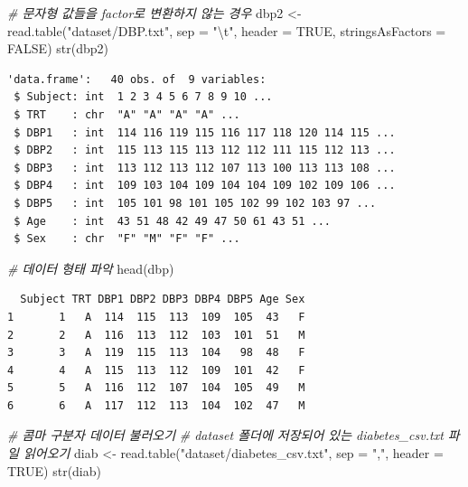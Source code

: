 \documentclass[
  11pt,
]{krantz}
\newenvironment{Shaded}{\begin{snugshade}}{\end{snugshade}}
\newcommand{\AttributeTok}[1]{\textcolor[rgb]{0.61,0.61,0.61}{#1}}
\newcommand{\CommentTok}[1]{\textcolor[rgb]{0.37,0.37,0.37}{\textit{#1}}}
\newcommand{\ConstantTok}[1]{\textcolor[rgb]{0,0,0}{#1}}
\newcommand{\FunctionTok}[1]{\textcolor[rgb]{0,0,0}{#1}}
\newcommand{\NormalTok}[1]{#1}
\newcommand{\OtherTok}[1]{\textcolor[rgb]{0.37,0.37,0.37}{#1}}
\newcommand{\SpecialCharTok}[1]{\textcolor[rgb]{0,0,0}{#1}}
\newcommand{\StringTok}[1]{\textcolor[rgb]{0.5,0.5,0.5}{#1}}
\begin{document}
\begin{Shaded}
\begin{Highlighting}[]
\CommentTok{\# 문자형 값들을 factor로 변환하지 않는 경우}
\NormalTok{dbp2 }\OtherTok{\textless{}{-}} \FunctionTok{read.table}\NormalTok{(}\StringTok{"dataset/DBP.txt"}\NormalTok{, }\AttributeTok{sep =} \StringTok{"}\SpecialCharTok{\textbackslash{}t}\StringTok{"}\NormalTok{, }
                   \AttributeTok{header =} \ConstantTok{TRUE}\NormalTok{, }
                   \AttributeTok{stringsAsFactors =} \ConstantTok{FALSE}\NormalTok{)}
\FunctionTok{str}\NormalTok{(dbp2)}
\end{Highlighting}
\end{Shaded}

\begin{verbatim}
'data.frame':   40 obs. of  9 variables:
 $ Subject: int  1 2 3 4 5 6 7 8 9 10 ...
 $ TRT    : chr  "A" "A" "A" "A" ...
 $ DBP1   : int  114 116 119 115 116 117 118 120 114 115 ...
 $ DBP2   : int  115 113 115 113 112 112 111 115 112 113 ...
 $ DBP3   : int  113 112 113 112 107 113 100 113 113 108 ...
 $ DBP4   : int  109 103 104 109 104 104 109 102 109 106 ...
 $ DBP5   : int  105 101 98 101 105 102 99 102 103 97 ...
 $ Age    : int  43 51 48 42 49 47 50 61 43 51 ...
 $ Sex    : chr  "F" "M" "F" "F" ...
\end{verbatim}

\begin{Shaded}
\begin{Highlighting}[]
\CommentTok{\# 데이터 형태 파악}
\FunctionTok{head}\NormalTok{(dbp)}
\end{Highlighting}
\end{Shaded}

\begin{verbatim}
  Subject TRT DBP1 DBP2 DBP3 DBP4 DBP5 Age Sex
1       1   A  114  115  113  109  105  43   F
2       2   A  116  113  112  103  101  51   M
3       3   A  119  115  113  104   98  48   F
4       4   A  115  113  112  109  101  42   F
5       5   A  116  112  107  104  105  49   M
6       6   A  117  112  113  104  102  47   M
\end{verbatim}

\begin{Shaded}
\begin{Highlighting}[]
\CommentTok{\# 콤마 구분자 데이터 불러오기}
\CommentTok{\# dataset 폴더에 저장되어 있는 diabetes\_csv.txt 파일 읽어오기}
\NormalTok{diab }\OtherTok{\textless{}{-}} \FunctionTok{read.table}\NormalTok{(}\StringTok{"dataset/diabetes\_csv.txt"}\NormalTok{, }\AttributeTok{sep =} \StringTok{","}\NormalTok{, }\AttributeTok{header =} \ConstantTok{TRUE}\NormalTok{)}
\FunctionTok{str}\NormalTok{(diab)}
\end{Highlighting}
\end{Shaded}
\end{document}

